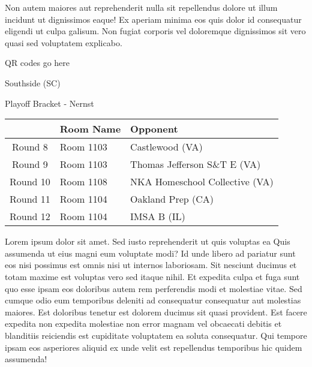 \documentclass{article}%
\begin{document}
\newline%
Non autem maiores aut reprehenderit nulla sit repellendus dolore ut illum incidunt ut dignissimos eaque! Ex aperiam minima eos quis dolor id consequatur eligendi ut culpa galisum. Non fugiat corporis vel doloremque dignissimos sit vero quasi sed voluptatem explicabo.\newline%
\newline%
%
\vspace*{30pt}%
\begin{center}%
\begin{Huge}%
QR codes go here%
\end{Huge}%
\end{center}%
\newpage%
\begin{center}%
\begin{Huge}%
Southside (SC)%
\end{Huge}%
\vspace*{8pt}%
\linebreak%
\begin{Large}%
Playoff Bracket {-} Nernst%
\end{Large}%
\end{center}%
\begin{tabularx}{\textwidth}{|c|Y|Y|}%
\hline%
&Room Name&Opponent\\%
\hline%
Round 8&Room 1103&Castlewood (VA)\\%
Round 9&Room 1103&Thomas Jefferson S\&T E (VA)\\%
Round 10&Room 1108&NKA Homeschool Collective (VA)\\%
Round 11&Room 1104&Oakland Prep (CA)\\%
Round 12&Room 1104&IMSA B (IL)\\%
\hline%
\end{tabularx}%
\vspace*{8pt}%
\linebreak%
\newline%
\newline%
Lorem ipsum dolor sit amet. Sed iusto reprehenderit ut quis voluptas ea Quis assumenda ut eius magni eum voluptate modi? Id unde libero ad pariatur sunt eos nisi possimus est omnis nisi ut internos laboriosam. Sit nesciunt ducimus et totam maxime est voluptas vero sed itaque nihil. Et expedita culpa et fuga sunt quo esse ipsam eos doloribus autem rem perferendis modi et molestiae vitae.\newline%
\newline%
Sed cumque odio eum temporibus deleniti ad consequatur consequatur aut molestias maiores. Est doloribus tenetur est dolorem ducimus sit quasi provident. Est facere expedita non expedita molestiae non error magnam vel obcaecati debitis et blanditiis reiciendis est cupiditate voluptatem ea soluta consequatur. Qui tempore ipsam eos asperiores aliquid ex unde velit est repellendus temporibus hic quidem assumenda!\newline%
\end{document}
